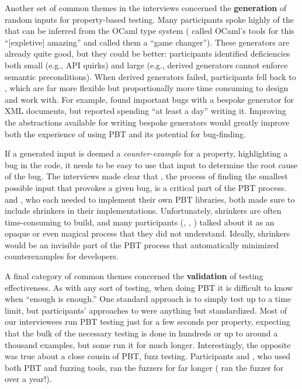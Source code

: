 Another set of common themes in the interviews concerned the {\bf generation} of
random inputs for property-based testing. Many participants spoke
highly of the  that can be inferred from
the OCaml type system ( called OCaml's tools for this
``[expletive] amazing'' and  called them a ``game changer'').
These generators are already quite good, but they could be better: participants
identified deficiencies both small (e.g., API quirks) and large (e.g.,
derived generators
cannot enforce semantic preconditions). When derived generators
failed, participants fell back to , which
are far more flexible but proportionally more time consuming to design and work
with. For example,  found important bugs with a bespoke
generator for XML documents,
but reported spending ``at least a day'' writing it.
Improving the abstractions available for writing bespoke generators would
greatly improve both the experience of using PBT and its potential for
bug-finding.

If a generated input is deemed a {\em counter-example} for a property,
highlighting a bug in the code, it needs to be easy to use that input to
determine the root cause of the bug. The interviews made clear that
, the process of finding the smallest possible input that
provokes a given bug, is a critical part of the PBT process.  
and , who each needed to implement their own PBT libraries, both
made sure to include shrinkers in their implementations. Unfortunately,
shrinkers are often time-consuming to build, and many participants
(,  , ) talked
about it as an opaque or even magical process that they did not understand.
Ideally, shrinkers would be an invisible part of the PBT process that
automatically minimized counterexamples for developers.

A final category of common themes concerned the {\bf validation} of testing
effectiveness. As with any sort of testing, when doing PBT it is difficult to
know when ``enough is enough.'' One standard approach is to simply test up to a
time limit, but participants' approaches to 
were anything but standardized.
Most of our interviewees run PBT testing just for a few seconds per property,
expecting that the bulk of the necessary testing is done in hundreds or up to
around a thousand examples, but some run it for much longer.
Interestingly, the opposite was true about a close cousin of PBT, fuzz testing.
Participants  and , who used both PBT and
fuzzing tools, ran the fuzzers for far longer
( ran the fuzzer for over a year!).


